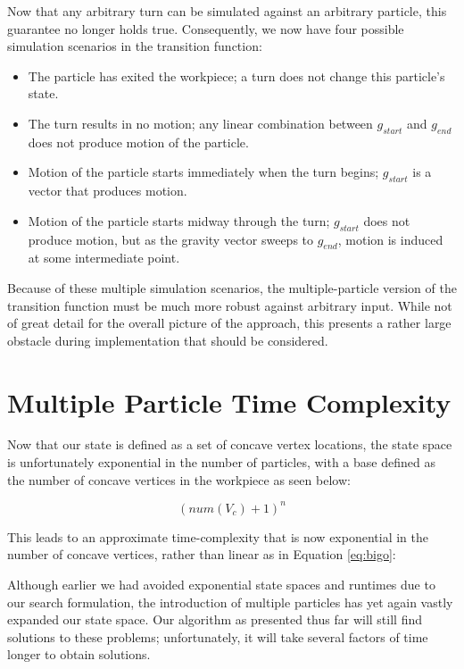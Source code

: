 Now that any arbitrary turn can be simulated against an arbitrary particle, this guarantee no longer holds true. Consequently, we now have four possible simulation scenarios in the transition function:


\begin{itemize}
\item The particle has exited the workpiece; a turn does not change this particle's state.
\item The turn results in no motion; any linear combination between $g_{start}$ and $g_{end}$ does not produce motion of the particle.
\item Motion of the particle starts immediately when the turn begins; $g_{start}$ is a vector that produces motion.
\item Motion of the particle starts midway through the turn; $g_{start}$ does not produce motion, but as the gravity vector sweeps to $g_{end}$, motion is induced at some intermediate point.
\end{itemize}

Because of these multiple simulation scenarios, the multiple-particle version of the transition function must be much more robust against arbitrary input. While not of great detail for the overall picture of the approach, this presents a rather large obstacle during implementation that should be considered.

\section{Multiple Particle Time Complexity}

Now that our state is defined as a set of concave vertex locations, the state space is unfortunately exponential in the number of particles, with a base defined as the number of concave vertices in the workpiece as seen below:

$$
(num(V_{c}) + 1)^n
$$

This leads to an approximate time-complexity that is now exponential in the number of concave vertices, rather than linear as in Equation \eqref{eq:bigo}:

 {
  \label{eq:bigoTotal}
}

Although earlier we had avoided exponential state spaces and runtimes due to our search formulation, the introduction of multiple particles has yet again vastly expanded our state space. Our algorithm as presented thus far will still find solutions to these problems; unfortunately, it will take several factors of time longer to obtain solutions.

